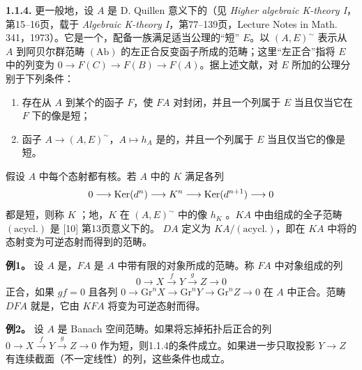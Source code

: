 \par\medskip\noindent\textbf{1.1.4.} 更一般地，设 $A$ 是 D. Quillen 意义下的（见 \emph{Higher algebraic K-theory I}，第15--16页，载于 \emph{Algebraic K-theory I}，第77--139页，Lecture Notes in Math. 341，1973）。它是一个，配备一族满足适当公理的“短” $E$。以 $(A,E)^{\sim}$ 表示从 $A$ 到阿贝尔群范畴 $(\mathrm{Ab})$ 的左正合反变函子所成的范畴；这里“左正合”指将 $E$ 中的列变为 $0\to F(C)\to F(B)\to F(A)$。据上述文献，对 $E$ 所加的公理分别于下列条件：
\begin{enumerate}[label=(\alph*)]
\item 存在从 $A$ 到某个的函子 $F$，使 $FA$ 对封闭，并且一个列属于 $E$ 当且仅当它在 $F$ 下的像是短；
\item 函子 $A\to(A,E)^{\sim}$，$A\mapsto h_A$ 是的，并且一个列属于 $E$ 当且仅当它的像是短。
\end{enumerate}
假设 $A$ 中每个态射都有核。若 $A$ 中的 $K$ 满足各列
\[
 0\longrightarrow\operatorname{Ker}(d^n)\longrightarrow K^n\longrightarrow\operatorname{Ker}(d^{n+1})\longrightarrow0
\]
都是短，则称 $K$ ；地，$K$ 在 $(A,E)^{\sim}$ 中的像 $h_K$ 。$KA$ 中由组成的全子范畴 $(\mathrm{acycl.})$ 是 [10] 第13页意义下的。 $DA$ 定义为 $KA/(\mathrm{acycl.})$，即在 $KA$ 中将的态射变为可逆态射而得到的范畴。

\par\medskip\noindent\textbf{例1。} 设 $A$ 是，$FA$ 是 $A$ 中带有限的对象所成的范畴。称 $FA$ 中对象组成的列
\[
 0\longrightarrow X\xrightarrow{f}Y\xrightarrow{g}Z\longrightarrow0
\]
正合，如果 $gf=0$ 且各列 $0\to\mathrm{Gr}^nX\to\mathrm{Gr}^nY\to\mathrm{Gr}^nZ\to0$ 在 $A$ 中正合。范畴 $DFA$ 就是，它由 $KFA$ 将变为可逆态射而得。

\par\medskip\noindent\textbf{例2。} 设 $A$ 是 Banach 空间范畴。如果将忘掉拓扑后正合的列 $0\to X\xrightarrow{f}Y\xrightarrow{g}Z\to0$ 作为短，则1.1.4的条件成立。如果进一步只取投影 $Y\to Z$ 有连续截面（不一定线性）的列，这些条件也成立。

